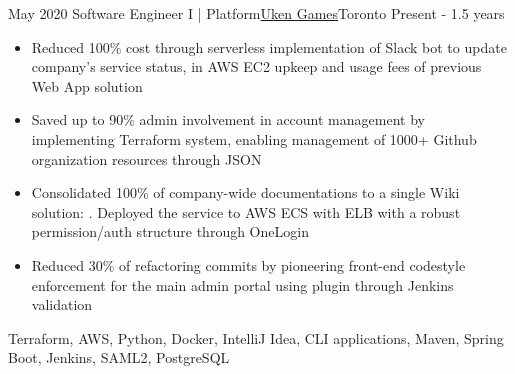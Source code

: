 %
%
%
\begin{experiences}
  \experience
    {May 2020}   {Software Engineer I | Platform}{\href{https://uken.com}{Uken Games}}{Toronto}
    {Present - 1.5 years} {
                    \begin{itemize}
                        \item Reduced 100\% cost through serverless implementation of Slack bot to update company's service status, in AWS EC2 upkeep and usage fees of previous Web App solution
                        
                        \item Saved up to 90\% admin involvement in account management by implementing Terraform system, enabling management of 1000+ Github organization resources through JSON
                        
                        \item Consolidated 100\% of company-wide documentations to a single Wiki solution: . Deployed the service to AWS ECS with ELB with a robust permission/auth structure through OneLogin 

                        \item Reduced 30\% of refactoring commits by pioneering front-end codestyle enforcement for the main admin portal using   plugin through Jenkins validation
                    \end{itemize}
                    }
                    {Terraform, AWS, Python, Docker, IntelliJ Idea, CLI applications, Maven, Spring Boot, Jenkins, SAML2, PostgreSQL}
\end{experiences}
